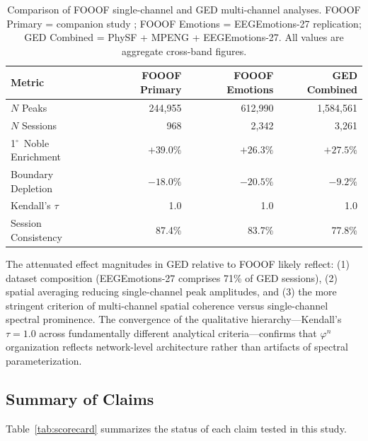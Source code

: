 \documentclass[11pt,a4paper]{article}
\newcommand{\degree}{$^\circ$}  %
\newcommand{\phisym}{\varphi}
\begin{document}
\begin{table}[H]
\centering
\caption{Comparison of FOOOF single-channel and GED multi-channel analyses. FOOOF Primary = companion study \parencite{lacy2026golden}; FOOOF Emotions = EEGEmotions-27 replication; GED Combined = PhySF + MPENG + EEGEmotions-27. All values are aggregate cross-band figures.}
\label{tab:fooof_vs_ged}
\small
\begin{tabular}{@{}lrrr@{}}
\toprule
Metric & FOOOF Primary & FOOOF Emotions & GED Combined \\
\midrule
$N$ Peaks & 244,955 & 612,990 & 1,584,561 \\
$N$ Sessions & 968 & 2,342 & 3,261 \\
1\degree\ Noble Enrichment & $+39.0\%$ & $+26.3\%$ & $+27.5\%$ \\
Boundary Depletion & $-18.0\%$ & $-20.5\%$ & $-9.2\%$ \\
Kendall's $\tau$ & 1.0 & 1.0 & 1.0 \\
Session Consistency & 87.4\% & 83.7\% & 77.8\% \\
\bottomrule
\end{tabular}
\end{table}

The attenuated effect magnitudes in GED relative to FOOOF likely reflect: (1) dataset composition (EEGEmotions-27 comprises 71\% of GED sessions), (2) spatial averaging reducing single-channel peak amplitudes, and (3) the more stringent criterion of multi-channel spatial coherence versus single-channel spectral prominence. The convergence of the qualitative hierarchy---Kendall's $\tau = 1.0$ across fundamentally different analytical criteria---confirms that $\phisym^n$ organization reflects network-level architecture rather than artifacts of spectral parameterization.

\subsection{Summary of Claims}

Table~\ref{tab:scorecard} summarizes the status of each claim tested in this study.
\end{document}
